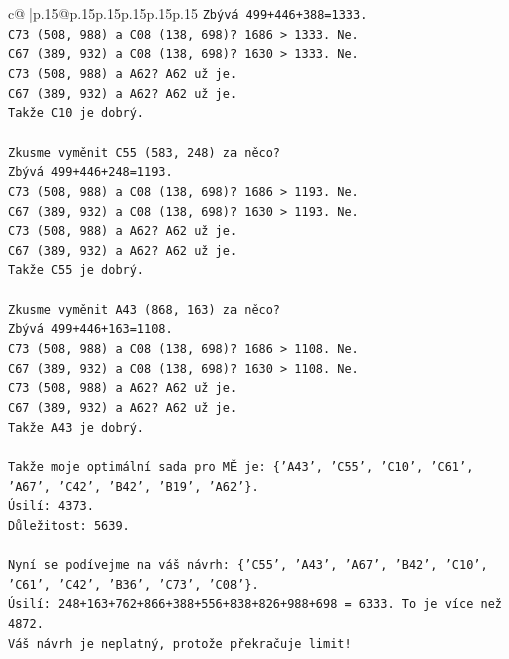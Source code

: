 \documentclass{article}
\begin{document}
{\begin{supertabular}{c@{$\;$}|p{.15\linewidth}@{}p{.15\linewidth}p{.15\linewidth}p{.15\linewidth}p{.15\linewidth}p{.15\linewidth}}
{{{\texttt{Zbývá 499+446+388=1333.} \\
\texttt{C73 (508, 988) a C08 (138, 698)? 1686 > 1333. Ne.} \\
\texttt{C67 (389, 932) a C08 (138, 698)? 1630 > 1333. Ne.} \\
\texttt{C73 (508, 988) a A62? A62 už je.} \\
\texttt{C67 (389, 932) a A62? A62 už je.} \\
\texttt{Takže C10 je dobrý.} \\
\\ 
\texttt{Zkusme vyměnit C55 (583, 248) za něco?} \\
\texttt{Zbývá 499+446+248=1193.} \\
\texttt{C73 (508, 988) a C08 (138, 698)? 1686 > 1193. Ne.} \\
\texttt{C67 (389, 932) a C08 (138, 698)? 1630 > 1193. Ne.} \\
\texttt{C73 (508, 988) a A62? A62 už je.} \\
\texttt{C67 (389, 932) a A62? A62 už je.} \\
\texttt{Takže C55 je dobrý.} \\
\\ 
\texttt{Zkusme vyměnit A43 (868, 163) za něco?} \\
\texttt{Zbývá 499+446+163=1108.} \\
\texttt{C73 (508, 988) a C08 (138, 698)? 1686 > 1108. Ne.} \\
\texttt{C67 (389, 932) a C08 (138, 698)? 1630 > 1108. Ne.} \\
\texttt{C73 (508, 988) a A62? A62 už je.} \\
\texttt{C67 (389, 932) a A62? A62 už je.} \\
\texttt{Takže A43 je dobrý.} \\
\\ 
\texttt{Takže moje optimální sada pro MĚ je: \{'A43', 'C55', 'C10', 'C61', 'A67', 'C42', 'B42', 'B19', 'A62'\}.} \\
\texttt{Úsilí: 4373.} \\
\texttt{Důležitost: 5639.} \\
\\ 
\texttt{Nyní se podívejme na váš návrh: \{'C55', 'A43', 'A67', 'B42', 'C10', 'C61', 'C42', 'B36', 'C73', 'C08'\}.} \\
\texttt{Úsilí: 248+163+762+866+388+556+838+826+988+698 = 6333. To je více než 4872.} \\
\texttt{Váš návrh je neplatný, protože překračuje limit!} \\
}}}
\end{supertabular}}
\end{document}
